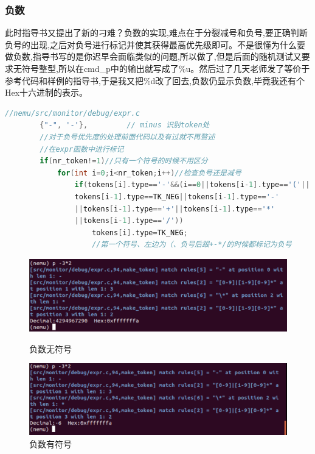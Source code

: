 \documentclass[UTF8,a4paper,10pt]{ctexart}
\begin{document}
{\subsubsection{负数}
    此时指导书又提出了新的刁难？负数的实现,难点在于分裂减号和负号,要正确判断负号的出现,之后对负号进行标记并使其获得最高优先级即可。不是很懂为什么要做负数,指导书写的是你迟早会面临类似的问题,所以做了,但是后面的随机测试又要求无符号整型,所以在cmd\_p中的输出就写成了\%u。然后过了几天老师发了等价于参考代码和样例的指导书,于是我又把\%d改了回去,负数仍显示负数,毕竟我还有个Hex十六进制的表示。
    \begin{lstlisting}[title=负数,frame=trbl,language={C++}]
        //nemu/src/monitor/debug/expr.c
        {"-", '-'},         // minus 识别token处
        //对于负号优先度的处理前面代码以及有过就不再赘述
        //在expr函数中进行标记
        if(nr_token!=1)//只有一个符号的时候不用区分
            for(int i=0;i<nr_token;i++)//检查负号还是减号
                if(tokens[i].type=='-'&&(i==0||tokens[i-1].type=='('||
                tokens[i-1].type==TK_NEG||tokens[i-1].type=='-'
                ||tokens[i-1].type=='+'||tokens[i-1].type=='*'
                ||tokens[i-1].type=='/'))
                    tokens[i].type=TK_NEG;
                    //第一个符号、左边为（、负号后跟+-*/的时候都标记为负号
    \end{lstlisting}
    \begin{figure}[!h]
        \begin{minipage}[h]{0.5\linewidth}
        \centering
        \includegraphics[scale=0.18]{fig/14.png}
        \caption{负数无符号}
        \end{minipage}%
        \hfill
        \begin{minipage}[h]{0.5\linewidth}
        \centering
        \includegraphics[scale=0.3]{fig/15.png}
        \caption{负数有符号}
        \end{minipage}
    \end{figure}

}
\end{document}
